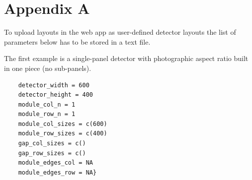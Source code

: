 \documentclass[11pt,a4paper]{article}
\begin{document}






{}



\vfill\newpage
\section*{Appendix A}

To upload layouts in the web app as user-defined detector layouts the list of parameters below has to be stored in a text file. 

The first example is a single-panel detector with photographic aspect ratio built in one piece (no sub-panels).

\begin{verbatim}
	detector_width = 600
	detector_height = 400
	module_col_n = 1
	module_row_n = 1
	module_col_sizes = c(600)
	module_row_sizes = c(400)
	gap_col_sizes = c()
	gap_row_sizes = c()
	module_edges_col = NA
	module_edges_row = NA}
\end{verbatim}
	
\end{document}

